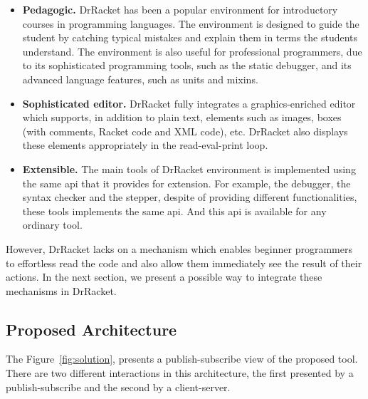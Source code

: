 \begin{itemize}
	\item \textbf{Pedagogic.} DrRacket has been a popular environment for introductory courses in programming languages. The environment is designed to guide the student by catching typical mistakes and explain them in terms the students understand. The environment is also useful for professional programmers, due to its sophisticated programming tools, such as the static debugger, and its advanced language features, such as units and mixins.

	\item \textbf{Sophisticated editor.} DrRacket fully integrates a graphics-enriched editor which supports, in addition to plain text, elements such as images, boxes (with comments, Racket code and XML code), etc. DrRacket also displays these elements appropriately in the read-eval-print loop.

	\item \textbf{Extensible.} The main tools of DrRacket environment is implemented using the same \ac{api} that it provides for extension. For example, the debugger, the syntax checker and the stepper, despite of providing different functionalities, these tools implements the same \ac{api}. And this \ac{api} is available for any ordinary tool.
\end{itemize}

However, DrRacket lacks on a mechanism which enables beginner programmers to effortless read the code and also allow them immediately see the result of their actions. In the next section, we present a possible way to integrate these mechanisms in DrRacket.

\subsection{Proposed Architecture}

The Figure~\ref{fig:solution}, presents a publish-subscribe view of the proposed tool. There are two different interactions in this architecture, the first presented by a publish-subscribe and the second by a client-server.


